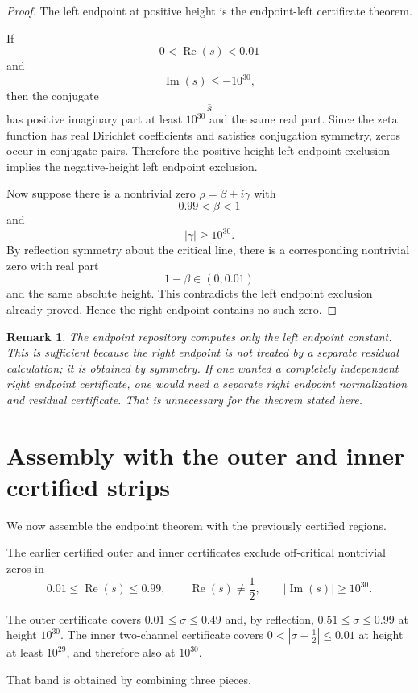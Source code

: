 \documentclass[11pt]{article}
\newtheorem{remark}[theorem]{Remark}
\DeclareMathOperator{\Rea}{Re}
\DeclareMathOperator{\Ima}{Im}
\begin{document}
\begin{proof}
The left endpoint at positive height is the endpoint-left certificate theorem.

If
\[
0<\Rea(s)<0.01
\]
and
\[
\Ima(s)\leq -10^{30},
\]
then the conjugate
\[
\overline{s}
\]
has positive imaginary part at least \(10^{30}\) and the same real part. Since the zeta function has real Dirichlet coefficients and satisfies conjugation symmetry, zeros occur in conjugate pairs. Therefore the positive-height left endpoint exclusion implies the negative-height left endpoint exclusion.

Now suppose there is a nontrivial zero \(\rho=\beta+i\gamma\) with
\[
0.99<\beta<1
\]
and
\[
|\gamma|\geq10^{30}.
\]
By reflection symmetry about the critical line, there is a corresponding nontrivial zero with real part
\[
1-\beta\in(0,0.01)
\]
and the same absolute height. This contradicts the left endpoint exclusion already proved. Hence the right endpoint contains no such zero.
\end{proof}

\begin{remark}
The endpoint repository computes only the left endpoint constant. This is sufficient because the right endpoint is not treated by a separate residual calculation; it is obtained by symmetry. If one wanted a completely independent right endpoint certificate, one would need a separate right endpoint normalization and residual certificate. That is unnecessary for the theorem stated here.
\end{remark}

\section{Assembly with the outer and inner certified strips}

We now assemble the endpoint theorem with the previously certified regions.

The earlier certified outer and inner certificates exclude off-critical
nontrivial zeros in
\[
0.01\leq \Rea(s)\leq 0.99,
\qquad
\Rea(s)\neq \frac12,
\qquad
|\Ima(s)|\geq 10^{30}.
\]

The outer certificate covers \(0.01\le\sigma\le0.49\) and, by reflection,
\(0.51\le\sigma\le0.99\) at height \(10^{30}\).  The inner two-channel
certificate covers \(0<|\sigma-\tfrac12|\le0.01\) at height at least
\(10^{29}\), and therefore also at \(10^{30}\).

That band is obtained by combining three pieces.
\end{document}
